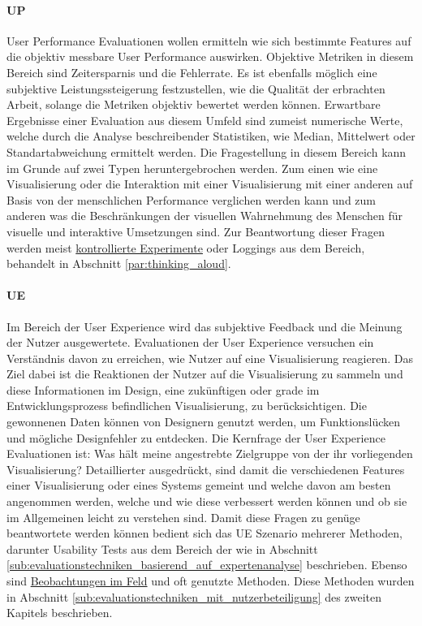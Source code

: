 \documentclass[draft=false
              ,paper=a4
              ,twoside=false
              ,fontsize=11pt
              ,headsepline
              ,BCOR10mm
              ,DIV11
              ]{scrbook}
\begin{document}
 \paragraph{UP} %
 \label{par:up}
 User Performance Evaluationen wollen ermitteln wie sich bestimmte Features auf die objektiv messbare User Performance auswirken. Objektive Metriken in diesem Bereich sind Zeitersparnis und die Fehlerrate. Es ist ebenfalls möglich eine subjektive Leistungssteigerung festzustellen, wie die Qualität der erbrachten Arbeit, solange die Metriken objektiv bewertet werden können. Erwartbare Ergebnisse einer Evaluation aus diesem Umfeld sind zumeist numerische Werte, welche durch die Analyse beschreibender Statistiken, wie Median, Mittelwert oder Standartabweichung ermittelt werden. Die Fragestellung in diesem Bereich kann im Grunde auf zwei Typen heruntergebrochen werden. Zum einen wie eine Visualisierung oder die Interaktion mit einer Visualisierung mit einer anderen auf Basis von der menschlichen Performance verglichen werden kann und zum anderen was die Beschränkungen der visuellen Wahrnehmung des Menschen für visuelle und interaktive Umsetzungen sind. Zur Beantwortung dieser Fragen werden meist \hyperref[ssub:empirische_techniken_auf_grundlage_von_experimenten]{kontrollierte Experimente} oder Loggings aus dem  Bereich, behandelt in Abschnitt \ref{par:thinking_aloud}.

 \paragraph{UE} %
 \label{par:ue}
 Im Bereich der User Experience wird das subjektive Feedback und die Meinung der Nutzer ausgewertete. Evaluationen der User Experience versuchen ein Verständnis davon zu erreichen, wie Nutzer auf eine Visualisierung reagieren. Das Ziel dabei ist die Reaktionen der Nutzer auf die Visualisierung zu sammeln und diese Informationen im Design, eine zukünftigen oder grade im Entwicklungsprozess befindlichen Visualisierung, zu berücksichtigen. Die gewonnenen Daten können von Designern genutzt werden, um Funktionslücken und mögliche Designfehler zu entdecken. Die Kernfrage der User Experience Evaluationen ist: Was hält meine angestrebte Zielgruppe von der ihr vorliegenden Visualisierung? Detaillierter ausgedrückt, sind damit die verschiedenen Features einer Visualisierung oder eines Systems gemeint und welche davon am besten angenommen werden, welche und wie diese verbessert werden können und ob sie im Allgemeinen leicht zu verstehen sind. Damit diese Fragen zu genüge beantwortete werden können bedient sich das UE Szenario mehrerer Methoden, darunter Usability Tests aus dem Bereich der  wie in Abschnitt \ref{sub:evaluationstechniken_basierend_auf_expertenanalyse} beschrieben. Ebenso sind \hyperref[ssub:techniken_auf_grundlage_von_beobachtungen]{Beobachtungen im Feld} und  oft genutzte Methoden. Diese Methoden wurden in Abschnitt \ref{sub:evaluationstechniken_mit_nutzerbeteiligung} des zweiten Kapitels beschrieben.
\end{document}
